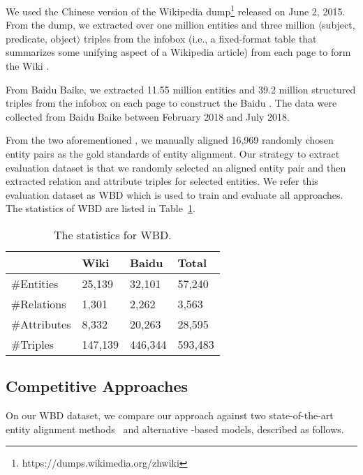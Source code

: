 	We used the Chinese version of the Wikipedia dump\footnote{https://dumps.wikimedia.org/zhwiki} released on June 2, 2015.
    From the dump, we extracted over one million entities and three million $\langle$subject, predicate, object$\rangle$ triples from the infobox (i.e., a fixed-format table that summarizes some unifying aspect of a Wikipedia article) from each page to form the Wiki \KG.
	
	 From Baidu Baike, we extracted 11.55 million entities and 39.2 million structured triples from the infobox on each page to construct the Baidu \KG. 
	The data were collected from Baidu Baike between February 2018 and July 2018.

	
	 From the two aforementioned \KGs, we manually aligned 16,969 randomly chosen entity pairs as the gold standards of entity alignment. 
	Our strategy to extract evaluation dataset is that we randomly selected an aligned entity pair and then extracted relation and attribute triples for selected entities. 
	We refer this evaluation dataset as WBD which is used to train and evaluate all approaches. The statistics of WBD are listed in Table~\ref{dataset}.
	

	\begin{table}
		\centering
		\begin{tabular}{llll}
			\toprule
			& Wiki & Baidu & Total \\
			\midrule
			\#Entities & 25,139 & 32,101 & 57,240 \\
			\#Relations & 1,301 & 2,262 & 3,563 \\
			\#Attributes & 8,332 & 20,263 & 28,595 \\
			\#Triples & 147,139 & 446,344 & 593,483 \\
			\bottomrule
		\end{tabular}
		\caption{The statistics for WBD.}
		\label{dataset}
	\end{table}
	
	\subsection{Competitive Approaches}
	On our WBD dataset, we compare our approach against two state-of-the-art entity alignment methods~\cite{hao2016joint,zhu2017iterative} and alternative \GCN-based models, described as follows.


